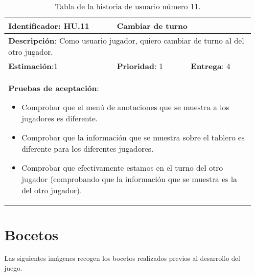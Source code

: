 \begin{table}[h]
  \begin{center}
    \begin{tabular}{|p{4cm}|p{4cm}|p{4cm}|}

    \hline
    \textbf{Identificador}: HU.11
    & \multicolumn{2}{p{8cm}|}{Cambiar de turno}\\

    \hline
    \multicolumn{3}{|p{12cm}|}{\textbf{Descripción}: Como usuario jugador, quiero cambiar de turno al del otro jugador.}\\

    \hline
    \textbf{Estimación}:1
    & \textbf{Prioridad}: 1
    & \textbf{Entrega}: 4\\

    \hline
    \multicolumn{3}{|p{12cm}|}{\textbf{Pruebas de aceptación}:
      \begin{itemize}
        \item Comprobar que el menú de anotaciones que se muestra a los jugadores es diferente.
        \item Comprobar que la información que se muestra sobre el tablero es diferente para los diferentes jugadores.
        \item Comprobar que efectivamente estamos en el turno del otro jugador (comprobando que la información que se muestra es la del otro jugador).
      \end{itemize}
    }\\

    \hline

    \end{tabular}

    \caption{Tabla de la historia de usuario número 11.}
    \label{tabla-hu11}

  \end{center}
\end{table}

\FloatBarrier


\section{Bocetos} \label{bocetos}

Las siguientes imágenes recogen los bocetos realizados previos al desarrollo del juego.\\

